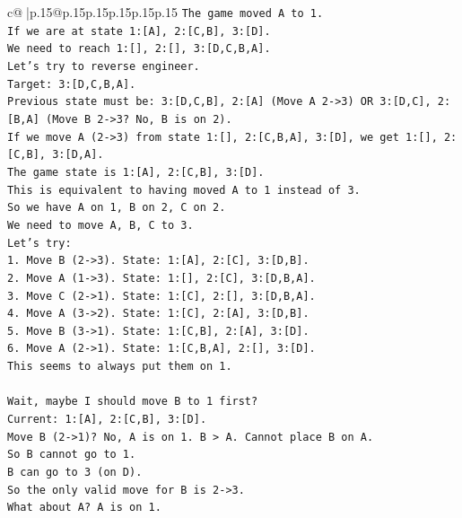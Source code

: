 \documentclass{article}
\begin{document}
{\begin{supertabular}{c@{$\;$}|p{.15\linewidth}@{}p{.15\linewidth}p{.15\linewidth}p{.15\linewidth}p{.15\linewidth}p{.15\linewidth}}
{{{\texttt{The game moved A to 1.} \\
\texttt{If we are at state 1:{[}A{]}, 2:{[}C,B{]}, 3:{[}D{]}.} \\
\texttt{We need to reach 1:{[}{]}, 2:{[}{]}, 3:{[}D,C,B,A{]}.} \\
\texttt{Let's try to reverse engineer.} \\
\texttt{Target: 3:{[}D,C,B,A{]}.} \\
\texttt{Previous state must be: 3:{[}D,C,B{]}, 2:{[}A{]} (Move A 2{-}>3) OR 3:{[}D,C{]}, 2:{[}B,A{]} (Move B 2{-}>3? No, B is on 2).} \\
\texttt{If we move A (2{-}>3) from state 1:{[}{]}, 2:{[}C,B,A{]}, 3:{[}D{]}, we get 1:{[}{]}, 2:{[}C,B{]}, 3:{[}D,A{]}.} \\
\texttt{The game state is 1:{[}A{]}, 2:{[}C,B{]}, 3:{[}D{]}.} \\
\texttt{This is equivalent to having moved A to 1 instead of 3.} \\
\texttt{So we have A on 1, B on 2, C on 2.} \\
\texttt{We need to move A, B, C to 3.} \\
\texttt{Let's try:} \\
\texttt{1. Move B (2{-}>3). State: 1:{[}A{]}, 2:{[}C{]}, 3:{[}D,B{]}.} \\
\texttt{2. Move A (1{-}>3). State: 1:{[}{]}, 2:{[}C{]}, 3:{[}D,B,A{]}.} \\
\texttt{3. Move C (2{-}>1). State: 1:{[}C{]}, 2:{[}{]}, 3:{[}D,B,A{]}.} \\
\texttt{4. Move A (3{-}>2). State: 1:{[}C{]}, 2:{[}A{]}, 3:{[}D,B{]}.} \\
\texttt{5. Move B (3{-}>1). State: 1:{[}C,B{]}, 2:{[}A{]}, 3:{[}D{]}.} \\
\texttt{6. Move A (2{-}>1). State: 1:{[}C,B,A{]}, 2:{[}{]}, 3:{[}D{]}.} \\
\texttt{This seems to always put them on 1.} \\
\\ 
\texttt{Wait, maybe I should move B to 1 first?} \\
\texttt{Current: 1:{[}A{]}, 2:{[}C,B{]}, 3:{[}D{]}.} \\
\texttt{Move B (2{-}>1)? No, A is on 1. B > A. Cannot place B on A.} \\
\texttt{So B cannot go to 1.} \\
\texttt{B can go to 3 (on D).} \\
\texttt{So the only valid move for B is 2{-}>3.} \\
\texttt{What about A? A is on 1.} \\
}}}
\end{supertabular}}
\end{document}
